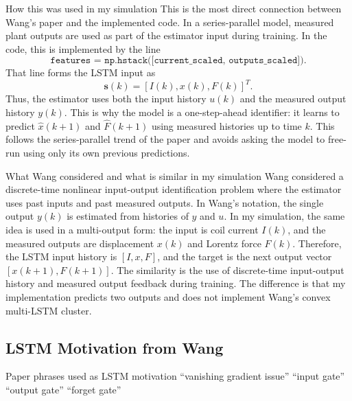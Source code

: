 \documentclass[11pt]{article}
\newcommand{\vect}[1]{\mathbf{#1}}
\begin{document}
\begin{implementationbox}{How this was used in my simulation}
This is the most direct connection between Wang's paper and the implemented code. In a series-parallel model, measured plant outputs are used as part of the estimator input during training. In the code, this is implemented by the line
\begin{equation}
\texttt{features = np.hstack([current\_scaled, outputs\_scaled])}.
\end{equation}
That line forms the LSTM input as
\begin{equation}
\vect{s}(k)=\left[I(k),x(k),F(k)\right]^T.
\end{equation}
Thus, the estimator uses both the input history $u(k)$ and the measured output history $y(k)$. This is why the model is a one-step-ahead identifier: it learns to predict $\hat{x}(k+1)$ and $\hat{F}(k+1)$ using measured histories up to time $k$. This follows the series-parallel trend of the paper and avoids asking the model to free-run using only its own previous predictions.
\end{implementationbox}

\begin{paperdecisionbox}{What Wang considered and what is similar in my simulation}
Wang considered a discrete-time nonlinear input-output identification problem where the estimator uses past inputs and past measured outputs. In Wang's notation, the single output $y(k)$ is estimated from histories of $y$ and $u$. In my simulation, the same idea is used in a multi-output form: the input is coil current $I(k)$, and the measured outputs are displacement $x(k)$ and Lorentz force $F(k)$. Therefore, the LSTM input history is $[I,x,F]$, and the target is the next output vector $[x(k+1),F(k+1)]$. The similarity is the use of discrete-time input-output history and measured output feedback during training. The difference is that my implementation predicts two outputs and does not implement Wang's convex multi-LSTM cluster.
\end{paperdecisionbox}

\subsection{LSTM Motivation from Wang}
\begin{paperbox}{Paper phrases used as LSTM motivation \cite{wang2017}}
\centering
``vanishing gradient issue'' \qquad ``input gate'' \qquad ``output gate'' \qquad ``forget gate''
\end{paperbox}
\end{document}

